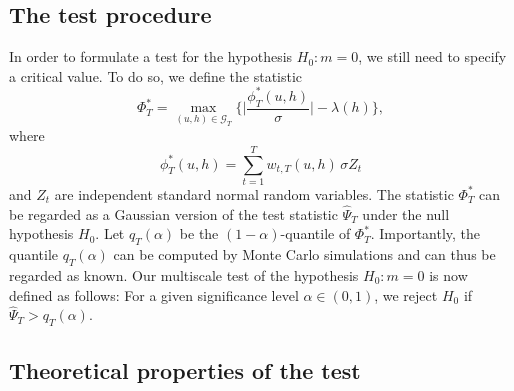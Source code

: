 \documentclass[a4paper,12pt]{article}
\numberwithin{equation}{section}
\begin{document}
\subsection{The test procedure}\label{subsec-method-test}


In order to formulate a test for the hypothesis $H_0: m = 0$, we still need to specify a critical value. To do so, we define the statistic
\[ \Phi_T^* = \max_{(u,h) \in \mathcal{G}_T} \Big\{ \Big|\frac{\phi_T^*(u,h)}{\sigma}\Big| - \lambda(h) \Big\}, \] 
where
\[ \phi_T^*(u,h) = \sum\limits_{t=1}^T w_{t,T}(u,h) \, \sigma Z_t \]
and $Z_t$ are independent standard normal random variables. The statistic $\Phi_T^*$ can be regarded as a Gaussian version of the test statistic $\widehat{\Psi}_T$ under the null hypothesis $H_0$. Let $q_T(\alpha)$ be the $(1-\alpha)$-quantile of $\Phi_T^*$. Importantly, the quantile $q_T(\alpha)$ can be computed by Monte Carlo simulations and can thus be regarded as known. Our multiscale test of the hypothesis $H_0: m = 0$ is now defined as follows: For a given significance level $\alpha \in (0,1)$, we reject $H_0$ if $\widehat{\Psi}_T > q_T(\alpha)$. 


\subsection{Theoretical properties of the test}\label{subsec-method-theo}
\end{document}
